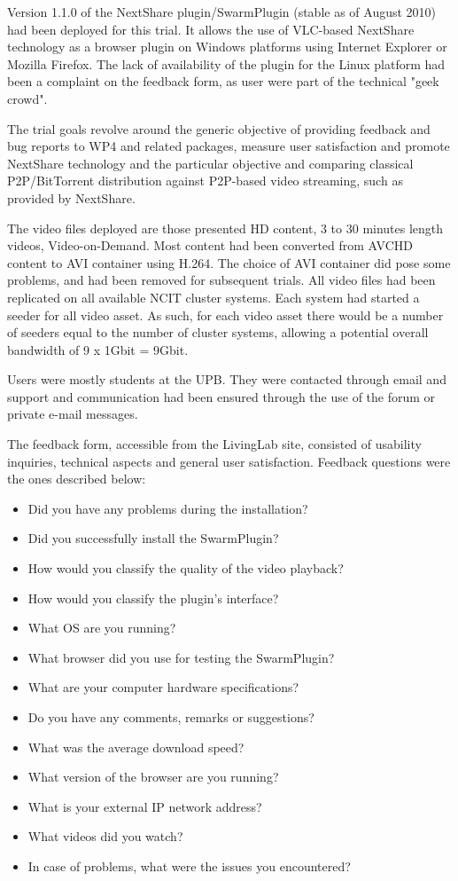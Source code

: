 Version 1.1.0 of the NextShare plugin/SwarmPlugin (stable as of August 2010)
had been deployed for this trial. It allows the use of VLC-based NextShare
technology as a browser plugin on Windows platforms using Internet Explorer or
Mozilla Firefox. The lack of availability of the plugin for the Linux platform
had been a complaint on the feedback form, as user were part of the technical
"geek crowd".

The trial goals revolve around the generic objective of providing feedback and
bug reports to WP4 and related packages, measure user satisfaction and promote
NextShare technology and the particular objective and comparing classical
P2P/BitTorrent distribution against P2P-based video streaming, such as
provided by NextShare.

The video files deployed are those presented HD content, 3 to 30 minutes
length videos, Video-on-Demand. Most content had been converted from AVCHD
content to AVI container using H.264. The choice of AVI container did pose
some problems, and had been removed for
subsequent trials. All video files had been replicated on all available NCIT
cluster systems. Each system had started a seeder for all video asset. As
such, for each video asset there would be a number of seeders equal to the
number of cluster systems, allowing a potential overall bandwidth of 9 x 1Gbit
= 9Gbit.

Users were mostly students at the UPB. They were contacted through email and
support and communication had been ensured through the use of the forum or
private e-mail messages.

The feedback form, accessible from the LivingLab site, consisted of usability
inquiries, technical aspects and general user satisfaction. Feedback questions
were the ones described below:
\begin{itemize}
  \item Did you have any problems during the installation?
  \item Did you successfully install the SwarmPlugin?
  \item How would you classify the quality of the video playback?
  \item How would you classify the plugin's interface?
  \item What OS are you running?
  \item What browser did you use for testing the SwarmPlugin?
  \item What are your computer hardware specifications?
  \item Do you have any comments, remarks or suggestions?
  \item What was the average download speed?
  \item What version of the browser are you running?
  \item What is your external IP network address?
  \item What videos did you watch?
  \item In case of problems, what were the issues you encountered?
\end{itemize}

